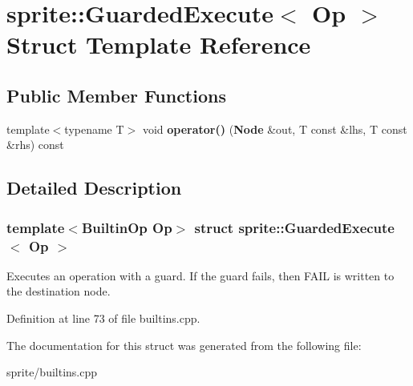 \section{sprite::Guarded\-Execute$<$ Op $>$ Struct Template Reference}
\label{structsprite_1_1GuardedExecute}
\subsection*{Public Member Functions}
\begin{CompactItemize}
\item 
template$<$typename T$>$ void {\bf operator()} ({\bf Node} \&out, T const \&lhs, T const \&rhs) const \label{structsprite_1_1GuardedExecute_a1}

\end{CompactItemize}


\subsection{Detailed Description}
\subsubsection*{template$<$Builtin\-Op Op$>$ struct sprite::Guarded\-Execute$<$ Op $>$}

Executes an operation with a guard. If the guard fails, then FAIL is written to the destination node. 



Definition at line 73 of file builtins.cpp.

The documentation for this struct was generated from the following file:\begin{CompactItemize}
\item 
sprite/builtins.cpp\end{CompactItemize}
